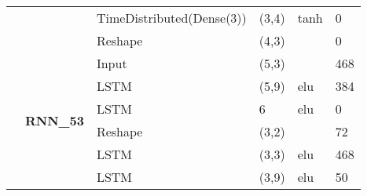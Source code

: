 \begin{table}[H]
\begin{center}
\begin{tabular}{ll|l|l|l|l|}
\multicolumn{1}{|l|}{}                                                                 &                                   & TimeDistributed(Dense(3))          & (3,4)                                & tanh                                     & 0                                           \\ \cline{3-6} 
\multicolumn{1}{|l|}{}                                                                 &                                   & Reshape                            & (4,3)                                &                                          & 0                                           \\ \cline{2-6} 
\multicolumn{1}{|l|}{}                                                                 & \multirow{8}{*}{\textbf{RNN\_53}} & Input                              & (5,3)                                &                                          & 468                                         \\ \cline{3-6} 
\multicolumn{1}{|l|}{}                                                                 &                                   & LSTM                               & (5,9)                                & elu                                     & 384                                         \\ \cline{3-6} 
\multicolumn{1}{|l|}{}                                                                 &                                   & LSTM                               & 6                                    & elu                                     & 0                                           \\ \cline{3-6} 
\multicolumn{1}{|l|}{}                                                                 &                                   & Reshape                            & (3,2)                                &                                          & 72                                          \\ \cline{3-6} 
\multicolumn{1}{|l|}{}                                                                 &                                   & LSTM                               & (3,3)                                & elu                                     & 468                                         \\ \cline{3-6} 
\multicolumn{1}{|l|}{}                                                                 &                                   & LSTM                               & (3,9)                                & elu                                     & 50                                          \\ \cline{3-6} 

\end{tabular}
\end{center}
\end{table}
